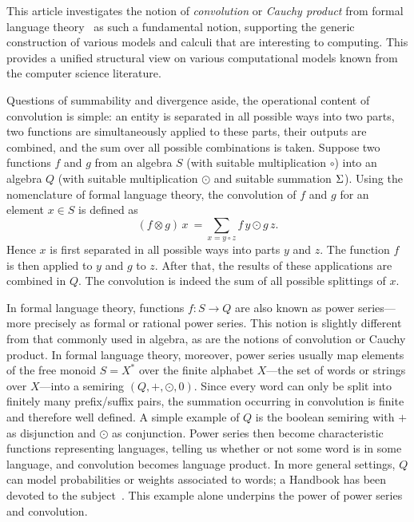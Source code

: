 \documentclass[12pt]{article}
\theoremstyle{definition}
\begin{document}
This article investigates the notion of \emph{convolution} or
\emph{Cauchy product} from formal language
theory~\cite{Handbook,BerstelReutenauer} as such a fundamental
notion, supporting the generic construction of various models and
calculi that are interesting to computing. This provides a unified
structural view on various computational models known from the
computer science literature.

Questions of summability and divergence aside, the operational content
of convolution is simple: an entity is separated in all possible ways
into two parts, two functions are simultaneously applied to these
parts, their outputs are combined, and the sum over all possible
combinations is taken. Suppose two functions $f$ and $g$ from an
algebra $S$ (with suitable multiplication $\circ$) into an algebra $Q$
(with suitable multiplication $\odot$ and suitable summation ${\rm
  \Sigma}$). Using the nomenclature of formal language theory, the
convolution of $f$ and $g$ for an element $x\in S$ is  defined as
\begin{equation*}
  (f\otimes g)\, x \ = \sum_{x=y\circ z} f\, y \odot g\, z.
\end{equation*}
Hence $x$ is first separated in all possible ways into parts $y$ and
$z$. The function $f$ is then applied to $y$ and $g$ to $z$. After
that, the results of these applications are combined in $Q$. The
convolution is indeed the sum of all possible splittings of $x$. 


In formal language theory, functions $f:S\to Q$ are also known as
power series---more precisely as formal or rational power series. This
notion is slightly different from that commonly used in algebra, as
are the notions of convolution or Cauchy product. In formal language theory,
moreover, power series usually map elements of the free monoid
$S=X^\ast$ over the finite alphabet $X$---the set of words or strings
over $X$---into a semiring $(Q,+,\odot,0)$. Since every word can only
be split into finitely many prefix/suffix pairs, the summation
occurring in convolution is finite and therefore well defined.  A
simple example of $Q$ is the boolean semiring with $+$ as disjunction
and $\odot$ as conjunction. Power series then become characteristic
functions representing languages, telling us whether or not some word
is in some language, and convolution becomes language product. In more
general settings, $Q$ can model probabilities or weights associated
to words; a Handbook has been devoted to the
subject~\cite{Handbook}. This example alone underpins the power of
power series and convolution.
\end{document}
